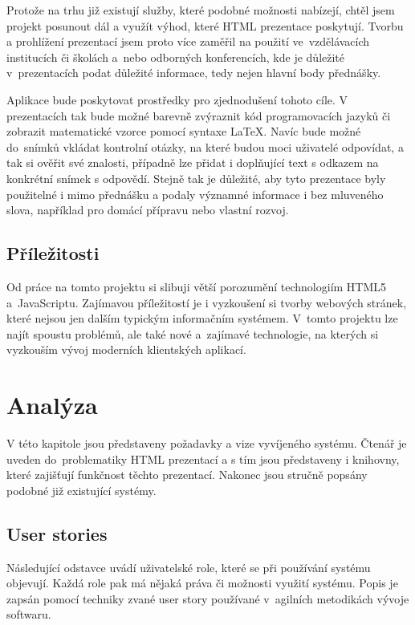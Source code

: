 \documentclass[11pt,twoside,a4paper]{book}
\newcommand*{\nom}[2]{#1\nomenclature{#1}{#2}} 			%
\begin{document}
Protože na trhu již existují služby, které podobné možnosti nabízejí, chtěl jsem projekt posunout dál a využít výhod, které HTML prezentace poskytují. Tvorbu a prohlížení prezentací jsem proto více zaměřil na použití ve~vzdělávacích institucích či školách a~nebo odborných konferencích, kde je důležité v~prezentacích podat důležité informace, tedy nejen hlavní body přednášky.

Aplikace bude poskytovat prostředky pro zjednodušení tohoto cíle. V prezentacích tak bude možné barevně zvýraznit kód programovacích jazyků či zobrazit matematické vzorce pomocí syntaxe \LaTeX. Navíc bude možné do~snímků vkládat kontrolní otázky, na které budou moci uživatelé odpovídat, a tak si ověřit své znalosti, případně lze přidat i doplňující text s odkazem na konkrétní snímek s odpovědí. Stejně tak je důležité, aby tyto prezentace byly použitelné i mimo přednášku a podaly významné informace i bez mluveného slova, například pro domácí přípravu nebo vlastní rozvoj. 

\section{Příležitosti}
Od práce na tomto projektu si slibuji větší porozumění technologiím HTML5 a~Java\-Scriptu. Zajímavou příležitostí je i vyzkoušení si tvorby webových stránek, které nejsou jen dalším typickým informačním systémem. V~tomto projektu lze najít spoustu problémů, ale také nové a~zajímavé technologie, na kterých si vyzkouším vývoj moderních klientských aplikací.




\chapter{Analýza}
V této kapitole jsou představeny požadavky a vize vyvíjeného systému. Čtenář je uveden do~problematiky \nom{HTML}{HyperText Markup Language} prezentací a s tím jsou představeny i knihovny, které zajišťují funkčnost těchto prezentací. Nakonec jsou stručně popsány podobné již existující systémy.


\section{User stories}\label{chap:userstory}
Následující odstavce uvádí uživatelské role, které se při používání systému objevují. Každá role pak má nějaká práva či možnosti využití systému. Popis je zapsán pomocí techniky zvané user story používané v~agilních metodikách vývoje softwaru.
\end{document}
